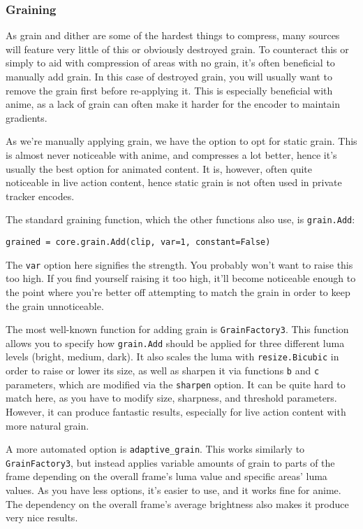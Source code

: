 \documentclass{scrartcl}
\begin{document}
\subsubsection{Graining}\label{graining}

As grain and dither are some of the hardest things to compress, many sources will feature very little of this or obviously destroyed grain. To counteract this or simply to aid with compression of areas with no grain, it's often beneficial to manually add grain. In this case of destroyed grain, you will usually want to remove the grain first before re-applying it. This is especially beneficial with anime, as a lack of grain can often make it harder for the encoder to maintain gradients.

As we're manually applying grain, we have the option to opt for static grain. This is almost never noticeable with anime, and compresses a lot better, hence it's usually the best option for animated content. It is, however, often quite noticeable in live action content, hence static grain is not often used in private tracker encodes.

The standard graining function, which the other functions also use, is \texttt{grain.Add}:
\begin{lstlisting}
grained = core.grain.Add(clip, var=1, constant=False)
\end{lstlisting}
The \texttt{var} option here signifies the strength. You probably won't want to raise this too high. If you find yourself raising it too high, it'll become noticeable enough to the point where you're better off attempting to match the grain in order to keep the grain unnoticeable.

The most well-known function for adding grain is \texttt{GrainFactory3}. This function allows you to specify how \texttt{grain.Add} should be applied for three different luma levels (bright, medium, dark). It also scales the luma with \texttt{resize.Bicubic} in order to raise or lower its size, as well as sharpen it via functions \texttt{b} and \texttt{c} parameters, which are modified via the \texttt{sharpen} option. It can be quite hard to match here, as you have to modify size, sharpness, and threshold parameters. However, it can produce fantastic results, especially for live action content with more natural grain.

A more automated option is \texttt{adaptive\_grain}. This works similarly to \texttt{GrainFactory3}, but instead applies variable amounts of grain to parts of the frame depending on the overall frame's luma value and specific areas' luma values. As you have less options, it's easier to use, and it works fine for anime. The dependency on the overall frame's average brightness also makes it produce very nice results.
\end{document}

